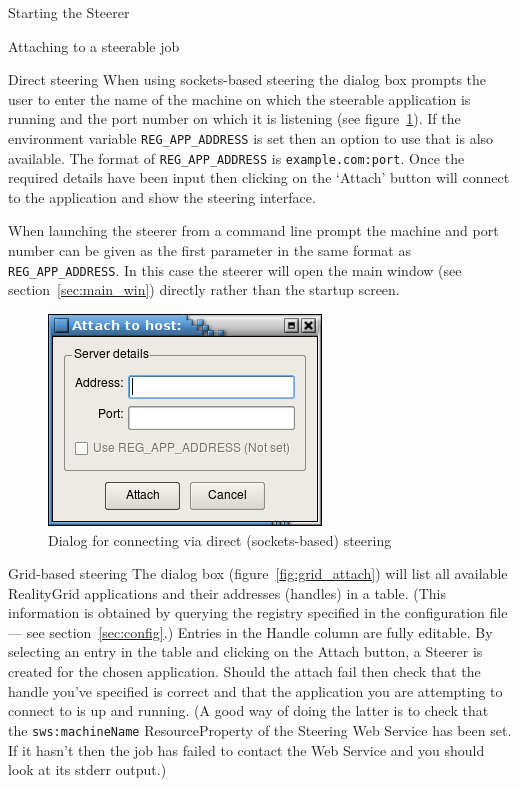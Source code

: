 \documentclass[a4paper,twoside]{article}
\begin{document}
\begin{section}{Starting the Steerer}
\begin{subsection}{Attaching to a steerable job}
\begin{subsubsection}{Direct steering}
When using sockets-based steering the dialog box prompts the user to
enter the name of the machine on which the steerable application is
running and the port number on which it is listening (see
figure~\ref{fig:sock_attach}). If the environment variable
\texttt{REG\_APP\_ADDRESS} is set then an option to use that is also
available. The format of \texttt{REG\_APP\_ADDRESS} is
\texttt{example.com:port}. Once the required details have been input
then clicking on the `Attach' button will connect to the application
and show the steering interface.

When launching the steerer from a command line prompt the machine and
port number can be given as the first parameter in the same format as
\texttt{REG\_APP\_ADDRESS}. In this case the steerer will open the
main window (see section~\ref{sec:main_win}) directly rather than the
startup screen.
\end{subsubsection}

\begin{figure}
\centerline{\includegraphics{sock_attach.png}}
\caption{Dialog for connecting via direct (sockets-based) steering}
\label{fig:sock_attach}
\end{figure}

\begin{subsubsection}{Grid-based steering}
The dialog box (figure~\ref{fig:grid_attach}) will list all available
RealityGrid applications and their addresses (handles) in a table.
(This information is obtained by querying the registry specified in
the configuration file --- see section~\ref{sec:config}.) Entries in
the Handle column are fully editable.  By selecting an entry in the
table and clicking on the Attach button, a Steerer is created for the
chosen application. Should the attach fail then check that the handle
you've specified is correct and that the application you are
attempting to connect to is up and running.  (A good way of doing the
latter is to check that the \texttt{sws:machineName} ResourceProperty
of the Steering Web Service has been set.  If it hasn't then the job
has failed to contact the Web Service and you should look at its
stderr output.)


\end{subsubsection}
\end{subsection}
\end{section}
\end{document}
